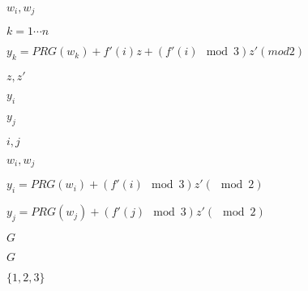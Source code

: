 \documentclass[10pt]{book}
\begin{document}
\begin{mdSnippets}
\begin{mdInlineSnippet}[9d66b5380a1702859617b42a06f59053]
$w_i,w_j$\end{mdInlineSnippet}%
\begin{mdInlineSnippet}[75ac6d289645a4e95aa31751cd9af497]%
$k = 1\cdots n$\end{mdInlineSnippet}%
\begin{mdInlineSnippet}[b3877f9cc6e869e88b57badeae568aa4]%
$y_k = PRG(w_k) + f'(i)z + (f'(i) \mod 3)z'( mod 2)$\end{mdInlineSnippet}%
\begin{mdInlineSnippet}[7677a22b8824f506996f58a1d63608ea]%
$z,z'$\end{mdInlineSnippet}%
\begin{mdInlineSnippet}[8d62e469fb30ed435a668eb5c035b1f6]%
$y_i$\end{mdInlineSnippet}%
\begin{mdInlineSnippet}[5a9ad302713f7739f121f71a8b263bab]%
$y_j$\end{mdInlineSnippet}%
\begin{mdInlineSnippet}[ee813f0ede8664a8049b1b6720f03b60]%
$i,j$\end{mdInlineSnippet}%
\begin{mdInlineSnippet}[9d66b5380a1702859617b42a06f59053]%
$w_i,w_j$\end{mdInlineSnippet}%
\begin{mdInlineSnippet}[a35367109551e49a214b8c47194aa93a]%
$y_i = PRG(w_i) + (f'(i) \mod 3)z'( \mod 2)$\end{mdInlineSnippet}%
\begin{mdInlineSnippet}[474ee8828c45b43970253d45bd8bb341]%
$y_j = PRG(w_j) + (f'(j)\mod 3)z'(\mod 2)$\end{mdInlineSnippet}%
\begin{mdInlineSnippet}[dfcf28d0734569a6a693bc8194de62bf]%
$G$\end{mdInlineSnippet}%
\begin{mdInlineSnippet}[dfcf28d0734569a6a693bc8194de62bf]%
$G$\end{mdInlineSnippet}%
\begin{mdInlineSnippet}[1d4734bc6db8002e08e28eec76ab0b7a]%
$\{1,2,3\}$\end{mdInlineSnippet}%
\begin{mdInlineSnippet}%

\end{mdInlineSnippet}
\end{mdSnippets}
\end{document}
